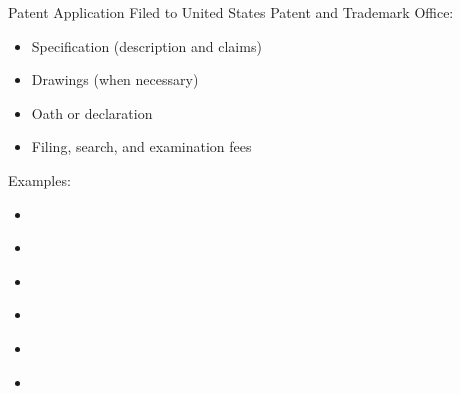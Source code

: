 \documentclass{beamer}
\begin{document}
\begin{frame}{Patent Application}
Filed to United States Patent and Trademark Office:
\begin{itemize}
\item Specification (description and claims)
\item Drawings (when necessary)
\item Oath or declaration
\item Filing, search, and examination fees
\end{itemize}
\bigskip
Examples:
\begin{itemize}
\item \href{http://www.google.com/patents/US5946647}{}
\item \href{http://www.google.com/patents/US7028023}{}
\item \href{http://www.google.com/patents/USD504889}{}
\item \href{https://www.google.com/patents/USD670713}{}
\item \href{https://www.google.com/patents/US7222078}{}
\item \href{http://www.google.com/patents/US5960411}{}
\end{itemize}
\end{frame}
\end{document}
